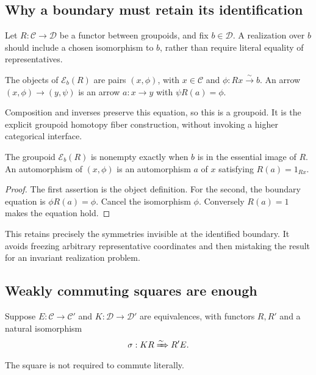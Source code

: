 \subsection{Why a boundary must retain its identification}
Let \(R:\mathcal C\to\mathcal D\) be a functor between groupoids, and fix \(b\in\mathcal D\). A realization over \(b\) should include a chosen isomorphism to \(b\), rather than require literal equality of representatives.

\begin{definition}
The objects of \(\mathcal E_b(R)\) are pairs \((x,\phi)\), with \(x\in\mathcal C\) and \(\phi:Rx\xrightarrow{\sim}b\). An arrow \((x,\phi)\to(y,\psi)\) is an arrow \(a:x\to y\) with \(\psi R(a)=\phi\).
\end{definition}
Composition and inverses preserve this equation, so this is a groupoid. It is the explicit groupoid homotopy fiber construction, without invoking a higher categorical interface.

\begin{proposition}\label{KS38}
The groupoid \(\mathcal E_b(R)\) is nonempty exactly when \(b\) is in the essential image of \(R\). An automorphism of \((x,\phi)\) is an automorphism \(a\) of \(x\) satisfying \(R(a)=1_{Rx}\).
\end{proposition}
\begin{proof}
The first assertion is the object definition. For the second, the boundary equation is \(\phi R(a)=\phi\). Cancel the isomorphism \(\phi\). Conversely \(R(a)=1\) makes the equation hold.
\end{proof}
This retains precisely the symmetries invisible at the identified boundary. It avoids freezing arbitrary representative coordinates and then mistaking the result for an invariant realization problem.


\subsection{Weakly commuting squares are enough}
Suppose \(E:\mathcal C\to\mathcal C'\) and \(K:\mathcal D\to\mathcal D'\) are equivalences, with functors \(R,R'\) and a natural isomorphism
\[
 \sigma:KR\xRightarrow{\sim}R'E.
\]
The square is not required to commute literally.

